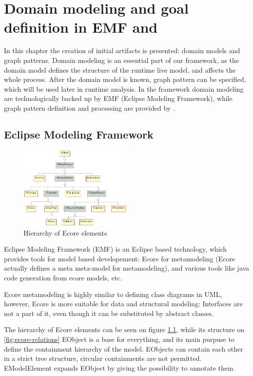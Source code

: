 \chapter{Domain modeling and goal definition in EMF and \viatra{}}

In this chapter the creation of initial artifacts is presented: domain models and graph patterns.
Domain modeling is an essential part of our framework, as the domain model defines the structure of the runtime live model, and affects the whole process. 
After the domain model is known, graph pattern can be specified, which will be used later in runtime analysis.
In the framework domain modeling are technologically backed up by EMF (Eclipse Modeling Framework), 
while graph pattern definition and processing are provided by \viatra{}.

\section{Eclipse Modeling Framework}


\begin{figure}[!ht]
	\begin{center}
		\includegraphics[width=0.5\textwidth]{figures/EcoreHierarchy.png}
		\caption{Hierarchy of Ecore elements}
		\label{fig:ecore-hierarchy}
	\end{center}
\end{figure}

Eclipse Modeling Framework (EMF) is an Eclipse based technology, which provides tools for model based developement: 
Ecore for metamodeling (Ecore actually defines a meta meta-model for metamodeling), and various tools like java code generation from ecore models, etc.

Ecore metamodeling is highly similar to defining class diagrams in UML, however, 
Ecore is more suitable for data and structural modeling: Interfaces are not a part of it, even though it can be substituted by abstract classes.

The hierarchy of Ecore elements can be seen on figure \ref{fig:ecore-hierarchy}, while its structure on \ref{fig:ecore-relations}
EObject is a base for everything, and its main purpuse to define the containment hierarchy of the model. 
EObjects can contain each other in a strict tree structure, circular containments are not permitted.
EModelElement expands EObject by giving the possibility to annotate them.

